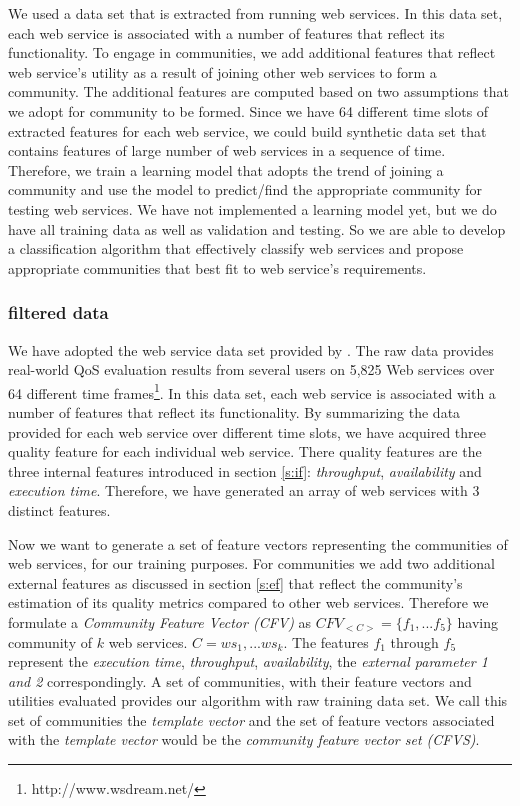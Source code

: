 \documentclass[10pt,journal,cspaper,compsoc]{IEEEtran}
\begin{document}
We used a data set that is extracted from running web services. In this data set, each web service is associated with a number of features that reflect its functionality. To engage in communities, we add additional features that reflect web service’s utility as a result of joining other web services to form a community. The additional features are computed based on two assumptions that we adopt for community to be formed. Since we have 64 different time slots of extracted features for each web service, we could build synthetic data set that contains features of large number of web services in a sequence of time. Therefore, we train a learning model that adopts the trend of joining a community and use the model to predict/find the appropriate community for testing web services. We have not implemented a learning model yet, but we do have all training data as well as validation and testing. So we are able to develop a classification algorithm that effectively classify web services and propose appropriate communities that best fit to web service’s requirements. 

\subsubsection{filtered data}\label{sss:filtereddata}

We have adopted the web service data set provided by \cite{10.1109/ISSRE.2011.17}. The raw data provides real-world QoS evaluation results from several users on 5,825 Web services over 64 different time frames\footnote{http://www.wsdream.net/}. In this data set, each web service is associated with a number of features that reflect its functionality. By summarizing the data provided for each web service over different time slots, we have acquired three quality feature for each individual web service. There quality features are the three internal features introduced in section \ref{s:if}: \emph{throughput}, \emph{availability} and \emph{execution time}. 
Therefore, we have generated an array of web services with 3 distinct features. 

Now we want to generate a set of feature vectors representing the communities of web services, for our training purposes. For communities we add two additional external features as discussed in section \ref{s:ef} that reflect the community's estimation of its quality metrics compared to other web services. Therefore we formulate a \emph{Community Feature Vector (CFV)} as $CFV_{<C>} = \{f_1,...f_5\}$ having community of $k$ web services. $C = {ws_1,...ws_k}$. The features $f_1$ through $f_5$ represent the \emph{execution time}, \emph{throughput}, \emph{availability}, the \emph{external parameter 1 and 2} correspondingly. A set of communities, with their feature vectors and utilities evaluated provides our algorithm with raw training data set. We call this set of communities the \emph{template vector} and the set of feature vectors associated with the \emph{template vector} would be the \emph{community feature vector set (CFVS)}.
\end{document}
